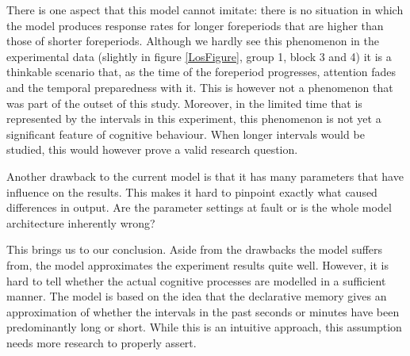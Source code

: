 \documentclass[10pt,letterpaper]{article}
\begin{document}
There is one aspect that this model cannot imitate: there is no situation in which the model produces response rates for longer foreperiods that are higher than those of shorter foreperiods. Although we hardly see this phenomenon in the experimental data (slightly in figure \ref{LosFigure}, group 1, block 3 and 4) it is a thinkable scenario that, as the time of the foreperiod progresses, attention fades and the temporal preparedness with it. This is however not a phenomenon that was part of the outset of this study. Moreover, in the limited time that is represented by the intervals in this experiment, this phenomenon is not yet a significant feature of cognitive behaviour. When longer intervals would be studied, this would however prove a valid research question.

Another drawback to the current model is that it has many parameters that have influence on the results. This makes it hard to pinpoint exactly what caused differences in output. Are the parameter settings at fault or is the whole model architecture inherently wrong?

This brings us to our conclusion. Aside from the drawbacks the model suffers from, the model approximates the experiment results quite well. However, it is hard to tell whether the actual cognitive processes are modelled in a sufficient manner. The model is based on the idea that the declarative memory gives an approximation of whether the intervals in the past seconds or minutes have been predominantly long or short. While this is an intuitive approach, this assumption needs more research to properly assert. 



\setlength{\bibleftmargin}{.125in}
\setlength{\bibindent}{-\bibleftmargin}

\end{document}
